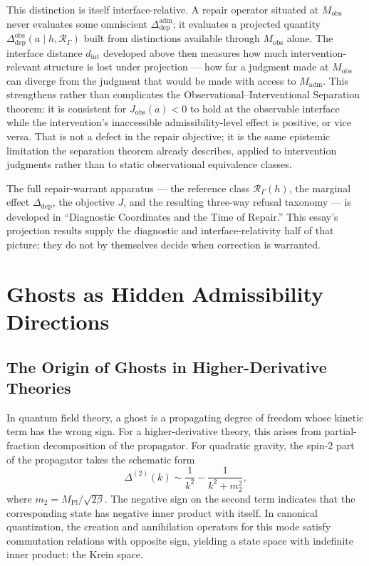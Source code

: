\documentclass[12pt,a4paper]{article}
\theoremstyle{remark}
\begin{document}
This distinction is itself interface-relative. A repair operator
situated at $M_{\mathrm{obs}}$ never evaluates some omniscient
$\Delta_{\mathrm{dep}}^{\mathrm{adm}}$; it evaluates a projected
quantity $\Delta_{\mathrm{dep}}^{\mathrm{obs}}(a \mid h,
\mathcal{R}_\Gamma)$ built from distinctions available through
$M_{\mathrm{obs}}$ alone. The interface distance $d_{\mathrm{int}}$
developed above then measures how much intervention-relevant structure
is lost under projection --- how far a judgment made at
$M_{\mathrm{obs}}$ can diverge from the judgment that would be made with
access to $M_{\mathrm{adm}}$. This strengthens rather than complicates
the Observational--Interventional Separation theorem: it is consistent
for $J_{\mathrm{obs}}(a) < 0$ to hold at the observable interface while
the intervention's inaccessible admissibility-level effect is positive,
or vice versa. That is not a defect in the repair objective; it is the
same epistemic limitation the separation theorem already describes,
applied to intervention judgments rather than to static observational
equivalence classes.

The full repair-warrant apparatus --- the reference class
$\mathcal{R}_\Gamma(h)$, the marginal effect $\Delta_{\mathrm{dep}}$,
the objective $J$, and the resulting three-way refusal taxonomy --- is
developed in ``Diagnostic Coordinates and the Time of Repair.'' This
essay's projection results supply the diagnostic and interface-relativity
half of that picture; they do not by themselves decide when correction
is warranted.


\section{Ghosts as Hidden Admissibility Directions}

\subsection{The Origin of Ghosts in Higher-Derivative Theories}

In quantum field theory, a ghost is a propagating degree of freedom whose
kinetic term has the wrong sign. For a higher-derivative theory, this arises
from partial-fraction decomposition of the propagator. For quadratic gravity,
the spin-2 part of the propagator takes the schematic form
\begin{equation}
  \Delta^{(2)}(k) \sim \frac{1}{k^2} - \frac{1}{k^2 + m_2^2},
\end{equation}
where $m_2 = M_{\mathrm{Pl}}/\sqrt{2\beta}$. The negative sign on the second
term indicates that the corresponding state has negative inner product with
itself. In canonical quantization, the creation and annihilation operators
for this mode satisfy commutation relations with opposite sign, yielding a
state space with indefinite inner product: the Krein space.
\end{document}

